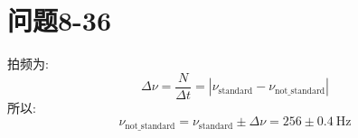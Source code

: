 \documentclass[12pt,a4paper]{article}
\begin{document}
		\section{问题8-36}
		拍频为:
		\begin{equation}
			\Delta\nu=\dfrac{N}{\Delta t}=\left| \nu_{\mathrm{standard}}-\nu_{\mathrm{not\_standard}}\right|
		\end{equation}
		所以:
		$$
		\nu_{\mathrm{not\_standard}}=\nu_{\mathrm{standard}}\pm\Delta\nu=256\pm0.4\ \mathrm{Hz}
		$$
\end{document}
